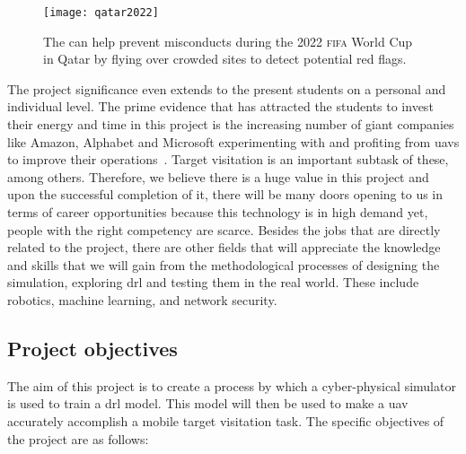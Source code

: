 \documentclass[../main.tex]{subfiles}
\begin{document}
\begin{figure}[tb] 
    \centering
    \texttt{[image: qatar2022]} 
    \caption{The \uav can help prevent misconducts during
    the 2022 \textsc{fifa} World Cup in Qatar by flying 
    over crowded sites to detect potential red flags.} 
    \label{fig:fifa} 
\end{figure}

The project significance even extends to the present students
on a personal and individual level.
The prime evidence that has attracted the students to invest
their energy and time in this project is
the increasing number of giant companies like Amazon, Alphabet
and Microsoft experimenting with and profiting from \glspl{uav}
to improve their operations~\cite{Jun17}.
Target visitation is an important subtask of these, among others.
Therefore, we believe there is a huge value
in this project and upon the successful completion of it,
there will be many doors opening to us in terms of
career opportunities because 
this technology is in high demand yet, 
people with the right competency
are scarce.
Besides the jobs that are directly related to the project,
there are other fields that will appreciate the knowledge
and skills that we will gain from the methodological processes 
of designing the simulation,
exploring \gls{drl} and testing them in the real world.
These include robotics, machine learning, and 
network security.

\subsection{Project objectives}\label{sec:objectives}

The aim of this project is to create a process 
by which a cyber-physical simulator is used to train 
a \gls{drl} model. This model will then be used
to make a \gls{uav} accurately accomplish a
mobile target visitation task.
The specific objectives of the project are as follows:
\end{document}
